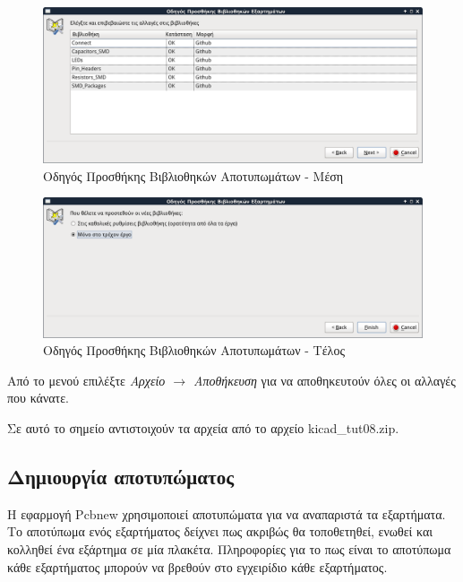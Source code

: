 \documentclass[a4paper]{article}
\begin{document}
\begin{figure}
  \begin{center}
    \includegraphics[width=.9\textwidth]{img/pcb-dial-libwiz2.png}
    \caption{Οδηγός Προσθήκης Βιβλιοθηκών Αποτυπωμάτων - Μέση}
    \label{fig:pcb-dial-libwiz2}
  \end{center}
\end{figure}

\begin{figure}
  \begin{center}
    \includegraphics[width=.9\textwidth]{img/pcb-dial-libwiz3.png}
    \caption{Οδηγός Προσθήκης Βιβλιοθηκών Αποτυπωμάτων - Τέλος}
    \label{fig:pcb-dial-libwiz3}
  \end{center}
\end{figure}

Από το μενού επιλέξτε \textit{Αρχείο $\rightarrow$ Αποθήκευση} για να αποθηκευτούν όλες οι αλλαγές που κάνατε.

Σε αυτό το σημείο αντιστοιχούν τα αρχεία από το αρχείο kicad\_tut08.zip.

\subsection{Δημιουργία αποτυπώματος}
Η εφαρμογή Pcbnew χρησιμοποιεί αποτυπώματα για να αναπαριστά τα εξαρτήματα. Το αποτύπωμα ενός εξαρτήματος δείχνει πως ακριβώς θα τοποθετηθεί, ενωθεί και κολληθεί ένα εξάρτημα σε μία πλακέτα. Πληροφορίες για το πως είναι το αποτύπωμα κάθε εξαρτήματος μπορούν να βρεθούν στο εγχειρίδιο κάθε εξαρτήματος. 
\end{document}
